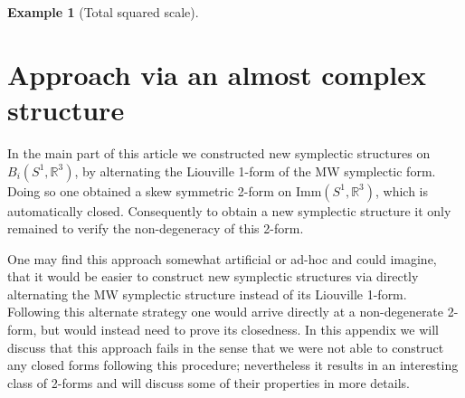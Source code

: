 \documentclass[12pt]{amsart}
\newcommand{\AuthorCOMMENT}[3]{\textcolor{#2}{{[\textbf{#1:} \textsl{#3}}]}}  %
\newcommand{\cSI}[1]{\AuthorCOMMENT{Sadashige}{violet}{#1}}
\newcommand{\rev}[1]{#1}
\theoremstyle{definition}
\newtheorem{example}[theorem]{Example}
\newcommand{\R}{\mathbb R}
\newcommand{\id}{\mathrm{id}}
\newcommand{\Imm}{\mathrm{Imm}}
\def\Om{\Omega}
\def\R{{\mathbb R}}
\let\on=\operatorname
\begin{document}
\begin{example}[Total squared scale]
\end{example}


\appendix

\rev{
\section{Approach via an almost complex structure}\label{sec:almost_symp_approach}
In the main part of this article we constructed new symplectic structures on $B_i(S^1,\mathbb R^3)$, by alternating the Liouville 1-form of the MW symplectic form. Doing so
one obtained a skew symmetric 2-form on $\Imm(S^1,\R^3)$, which is automatically closed. Consequently to obtain a new symplectic structure it only remained to verify the non-degeneracy of this 2-form. 

One may find this approach somewhat artificial or ad-hoc and could imagine, that it would be easier to construct new symplectic structures via directly alternating the MW symplectic structure instead of its Liouville 1-form. Following this alternate strategy one would arrive directly at a non-degenerate 2-form, but would instead need to prove its closedness. 
In this appendix we will discuss that this approach fails in the sense that we were not able to construct any closed forms following this procedure; nevertheless it results in an interesting class of 2-forms and will discuss some of their properties in more details. 
}
\end{document}
